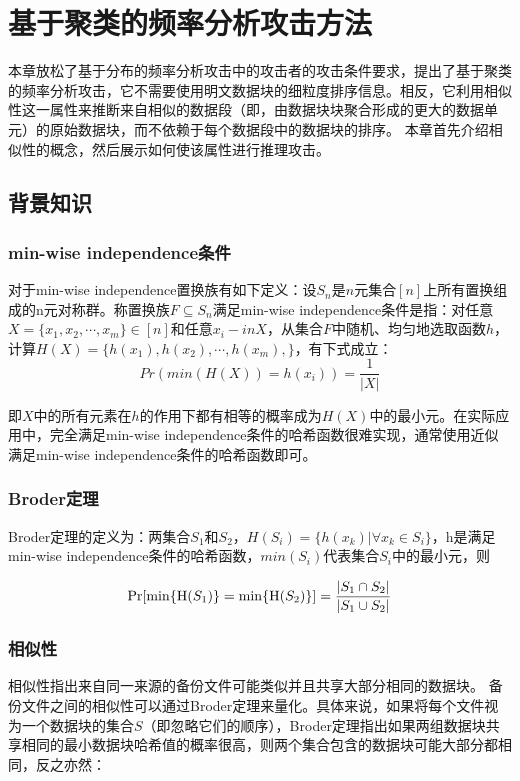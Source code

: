 \chapter{基于聚类的频率分析攻击方法}
\label{sec:ClusteringAttack}

本章放松了基于分布的频率分析攻击中的攻击者的攻击条件要求，提出了基于聚类的频率分析攻击，它不需要使用明文数据块的细粒度排序信息。相反，它利用相似性这一属性来推断来自相似的数据段（即，由数据块块聚合形成的更大的数据单元）的原始数据块，而不依赖于每个数据段中的数据块的排序。 本章首先介绍相似性的概念，然后展示如何使该属性进行推理攻击。

\section{背景知识}
\label{sec:similarity}

\subsection{min-wise independence条件}

对于min-wise independence置换族有如下定义：设$S_n$是$n$元集合$[n]$上所有置换组成的n元对称群。称置换族$F \subseteq S_n$满足min-wise independence条件是指：对任意$X=\{x_1,x_2,\cdots,x_m\}\in[n]$和任意$x_i-inX$，从集合$F$中随机、均匀地选取函数$h$，计算$H(X)=\{h(x_1),h(x_2),\cdots,h(x_m),\}$，有下式成立：
\begin{equation}
    \label{eq:min-wise independence}
    Pr(min(H(X)) = h(x_i) ) = \frac{1}{|X|}
\end{equation}

即$X$中的所有元素在$h$的作用下都有相等的概率成为$H(X)$中的最小元。在实际应用中，完全满足min-wise independence条件的哈希函数很难实现，通常使用近似满足min-wise independence条件的哈希函数即可。

\subsection{Broder定理}
Broder定理\cite{broder1997resemblance}的定义为：两集合$S_1$和$S_2$，$H(S_i)=\{h(x_k)|\forall x_k \in S_i \}$，h是满足min-wise independence条件的哈希函数，$min(S_i)$代表集合$S_i$中的最小元，则

\begin{equation}
    \label{eq:broder}
    \Pr[\min\{{\rm H}(S_1)\} = \min\{{\rm H}(S_2)\} ] = \frac{|S_1 \cap S_2|}{|S_1 \cup S_2|}
\end{equation}

\subsection{相似性}
相似性\cite{bhagwat2009extreme}指出来自同一来源的备份文件可能类似并且共享大部分相同的数据块。 备份文件之间的相似性可以通过Broder定理\cite{broder1997resemblance}来量化。具体来说，如果将每个文件视为一个数据块的集合$S$（即忽略它们的顺序），Broder定理指出如果两组数据块共享相同的最小数据块哈希值的概率很高，则两个集合包含的数据块可能大部分都相同，反之亦然：
 
